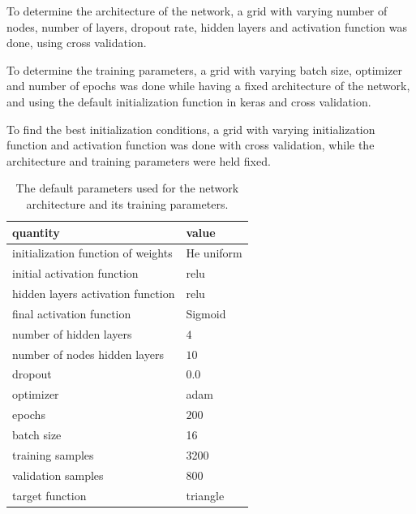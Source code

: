 \documentclass[prl,twocolumn]{revtex4-1}
\begin{document}
To determine the architecture of the network, a grid with varying number of nodes, number of layers, dropout rate, hidden layers and activation function was done, using cross validation.

To determine the training parameters, a grid with varying batch size, optimizer and number of epochs was done while having a fixed architecture of the network, and using the default initialization function in keras and cross validation.

To find the best initialization conditions, a grid with varying initialization function and activation function was done with cross validation, while the architecture and training parameters were held fixed.


\begin{table}[!b]
\begin{center}
\begin{tabular}{ll}
quantity & value \\
\hline
initialization function of weights & He uniform\\ 
initial activation function & relu \\
hidden layers activation function & relu\\
final activation function & Sigmoid \\
number of hidden layers & $4$ \\
number of nodes hidden layers & $10$\\
dropout & $0.0$\\
optimizer & adam\\
epochs & $200$ \\
batch size & 16\\
training samples & 3200\\
validation samples & 800\\
target function & triangle
\end{tabular}
\end{center}
\caption{The default parameters used for the network architecture and its training parameters.}
\label{tab:optimal_value}
\end{table}
\end{document}

